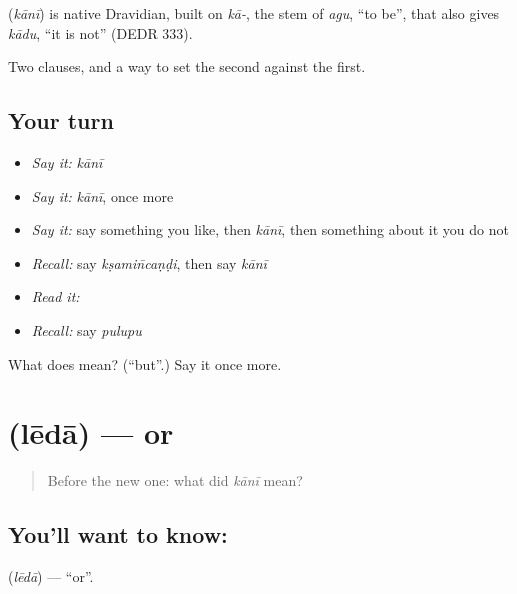 \begin{cousinweb}
\textbf{} (\emph{kānī}) is native Dravidian, built on \emph{kā-}, the stem of \emph{agu}, \textquotedblleft{}to be\textquotedblright{}, that also gives \emph{kādu}, \textquotedblleft{}it is not\textquotedblright{} (DEDR 333).
\end{cousinweb}

\begin{grammarlens}[title={What you've built}]
Two clauses, and a way to set the second against the first.
\end{grammarlens}

\subsection*{Your turn}
\begin{itemize}
\raggedright
  \item \emph{Say it:} \emph{kānī}
  \item \emph{Say it:} \emph{kānī}, once more
  \item \emph{Say it:} say something you like, then \emph{kānī}, then something about it you do not
  \item \emph{Recall:} say \emph{kṣamin̄caṇḍi}, then say \emph{kānī}
  \item \emph{Read it:} \textbf{}
  \item \emph{Recall:} say \emph{pulupu}
\end{itemize}

\begin{tcolorbox}[breakable,colback=teal!4,colframe=teal!35!black,title={Before you move on}]
What does  mean? (\textquotedblleft{}but\textquotedblright{}.) Say it once more.
\end{tcolorbox}
\section[\texorpdfstring{\te{లేదా} (lēdā)}{లేదా (lēdā)}]{ (lēdā) — or}

\label{lesson:TE-C74-or}



\begin{quote}
Before the new one: what did \emph{kānī} mean?
\end{quote}

\subsection*{You'll want to know: }
\textbf{} (\emph{lēdā}) — \textquotedblleft{}or\textquotedblright{}.

